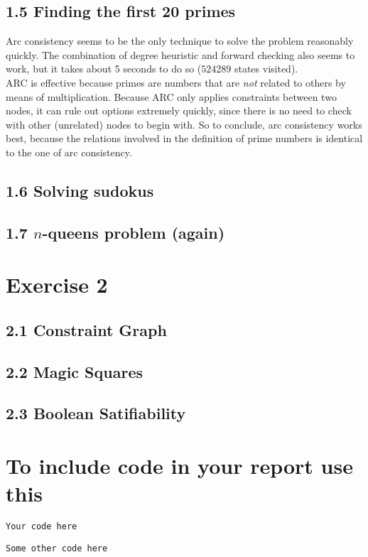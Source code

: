 \documentclass{article}
\begin{document}
\subsection*{1.5 \hspace*{0.3cm} Finding the first 20 primes}
Arc consistency seems to be the only technique to solve the problem reasonably quickly. The combination of degree heuristic and forward checking also seems to work, but it takes about 5 seconds to do so ($524289$ states visited). \\
ARC is effective because primes are numbers that are \textit{not} related to others by means of multiplication. Because ARC only applies constraints between two nodes, it can rule out options extremely quickly, since there is no need to check with other (unrelated) nodes to begin with. So to conclude, arc consistency works best, because the relations involved in the definition of prime numbers is identical to the one of arc consistency.
\subsection*{1.6 \hspace*{0.3cm} Solving sudokus}
\subsection*{1.7 \hspace*{0.3cm} $n$-queens problem (again)}

\section*{Exercise 2}
\subsection*{2.1 \hspace*{0.3cm} Constraint Graph}
\subsection*{2.2 \hspace*{0.3cm} Magic Squares}
\subsection*{2.3 \hspace*{0.3cm} Boolean Satifiability}

\section*{To include code in your report use this}
\begin{lstlisting}[title=\textbf{Main.c}]
Your code here
\end{lstlisting}

\begin{lstlisting}[title=\textbf{Somefile.c}]
Some other code here
\end{lstlisting}
\end{document}
